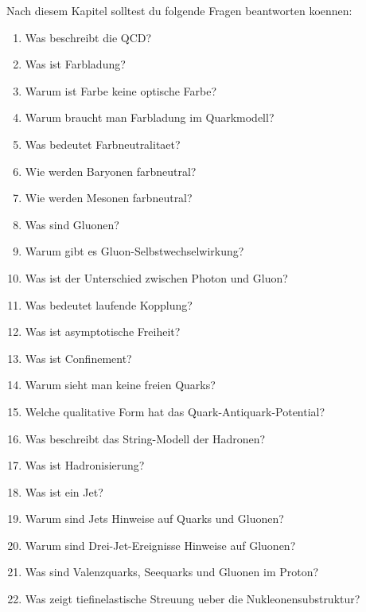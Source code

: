 \begin{examtipbox}
Nach diesem Kapitel solltest du folgende Fragen beantworten koennen:
\begin{enumerate}
    \item Was beschreibt die QCD?
    \item Was ist Farbladung?
    \item Warum ist Farbe keine optische Farbe?
    \item Warum braucht man Farbladung im Quarkmodell?
    \item Was bedeutet Farbneutralitaet?
    \item Wie werden Baryonen farbneutral?
    \item Wie werden Mesonen farbneutral?
    \item Was sind Gluonen?
    \item Warum gibt es Gluon-Selbstwechselwirkung?
    \item Was ist der Unterschied zwischen Photon und Gluon?
    \item Was bedeutet laufende Kopplung?
    \item Was ist asymptotische Freiheit?
    \item Was ist Confinement?
    \item Warum sieht man keine freien Quarks?
    \item Welche qualitative Form hat das Quark-Antiquark-Potential?
    \item Was beschreibt das String-Modell der Hadronen?
    \item Was ist Hadronisierung?
    \item Was ist ein Jet?
    \item Warum sind Jets Hinweise auf Quarks und Gluonen?
    \item Warum sind Drei-Jet-Ereignisse Hinweise auf Gluonen?
    \item Was sind Valenzquarks, Seequarks und Gluonen im Proton?
    \item Was zeigt tiefinelastische Streuung ueber die Nukleonensubstruktur?
\end{enumerate}
\end{examtipbox}